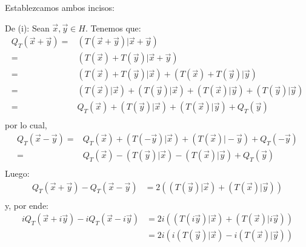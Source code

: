 \documentclass[12pt]{report}
\theoremstyle{largebreak}
\newcommand\pint[2]{\ensuremath{\left(#1\big|#2\right)}}
\begin{document}
    \begin{sol}
        Establezcamos ambos incisos:
        
        De (i): Sean $\vec{x},\vec{y}\in H$. Tenemos que:
        \begin{equation*}
            \begin{split}
                Q_T(\vec{x}+\vec{y})=&\pint{T(\vec{x}+\vec{y})}{\vec{x}+\vec{y}}\\
                =&\pint{T(\vec{x})+T(\vec{y})}{\vec{x}+\vec{y}}\\
                =&\pint{T(\vec{x})+T(\vec{y})}{\vec{x}}+\pint{T(\vec{x})+T(\vec{y})}{\vec{y}}\\
                =&\pint{T(\vec{x})}{\vec{x}}+\pint{T(\vec{y})}{\vec{x}}+\pint{T(\vec{x})}{\vec{y}}+\pint{T(\vec{y})}{\vec{y}}\\
                =&Q_T(\vec{x})+\pint{T(\vec{y})}{\vec{x}}+\pint{T(\vec{x})}{\vec{y}}+Q_T(\vec{y})\\
            \end{split}
        \end{equation*}
        por lo cual,
        \begin{equation*}
            \begin{split}
                Q_T(\vec{x}-\vec{y})=&Q_T(\vec{x})+\pint{T(-\vec{y})}{\vec{x}}+\pint{T(\vec{x})}{-\vec{y}}+Q_T(-\vec{y})\\
                =&Q_T(\vec{x})-\pint{T(\vec{y})}{\vec{x}}-\pint{T(\vec{x})}{\vec{y}}+Q_T(\vec{y})\\
            \end{split}
        \end{equation*}
        Luego:
        \begin{equation*}
            \begin{split}
                Q_T(\vec{x}+\vec{y})-Q_T(\vec{x}-\vec{y})&=2\left(\pint{T(\vec{y})}{\vec{x}}+\pint{T(\vec{x})}{\vec{y}}\right)\\
            \end{split}
        \end{equation*}
        y, por ende:
        \begin{equation*}
            \begin{split}
                iQ_T(\vec{x}+i\vec{y})-iQ_T(\vec{x}-i\vec{y})&=2i\left(\pint{T(i\vec{y})}{\vec{x}}+\pint{T(\vec{x})}{i\vec{y}}\right)\\
                &=2i\left(i\pint{T(\vec{y})}{\vec{x}}-i\pint{T(\vec{x})}{\vec{y}}\right)\\

\end{split}
\end{equation*}
\end{sol}
\end{document}
